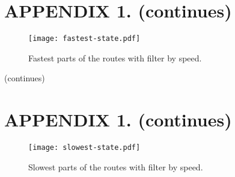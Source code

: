 \thispagestyle{empty}
\section*{APPENDIX 1. (continues)}

\vfill

\begin{figure}[ht]
  \centering
  \captionsetup{justification=centering,margin=0.2cm}
  \texttt{[image: fastest-state.pdf]}
  \caption{Fastest parts of the routes with filter by speed.}
  \label{pic:fasteststate}
\end{figure}

\vfill
\begin{flushright}
  (continues)
\end{flushright}

\thispagestyle{empty}
\section*{APPENDIX 1. (continues)}

\vfill

\begin{figure}[ht]
  \centering
  \captionsetup{justification=centering,margin=0.2cm}
  \texttt{[image: slowest-state.pdf]}
  \caption{Slowest parts of the routes with filter by speed.}
  \label{pic:sloweststate}
\end{figure}

\vfill

\thispagestyle{empty}